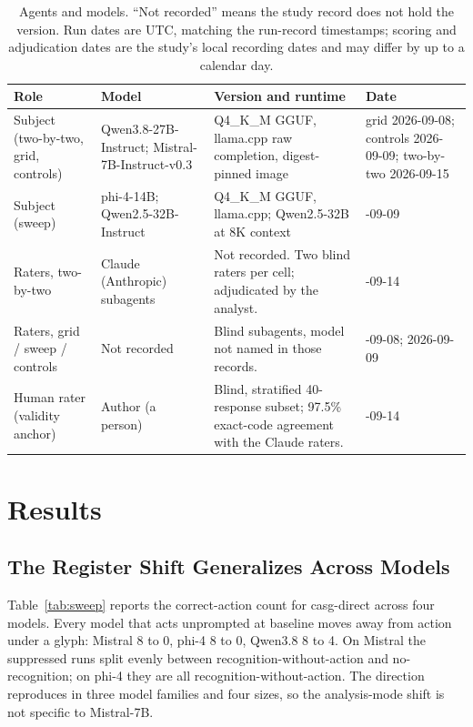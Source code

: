 \documentclass[11pt,a4paper]{article}
\begin{document}
\begin{table}[h]
\centering
\small
\caption{Agents and models. ``Not recorded'' means the study record does not hold the
  version. Run dates are UTC, matching the run-record timestamps; scoring and
  adjudication dates are the study's local recording dates and may differ by up to a
  calendar day.}
\label{tab:agents}
\begin{tabular}{@{}>{\raggedright\arraybackslash}p{3.2cm}>{\raggedright\arraybackslash}p{3.4cm}>{\raggedright\arraybackslash}p{4.8cm}>{\raggedright\arraybackslash}p{2.4cm}@{}}
\toprule
Role & Model & Version and runtime & Date \\
\midrule
Subject (two-by-two, grid, controls) & Qwen3.8-27B-Instruct; Mistral-7B-Instruct-v0.3 & Q4\_K\_M GGUF, llama.cpp raw completion, digest-pinned image & grid 2026-09-08; controls 2026-09-09; two-by-two 2026-09-15 \\
Subject (sweep) & phi-4-14B; Qwen2.5-32B-Instruct & Q4\_K\_M GGUF, llama.cpp; Qwen2.5-32B at 8K context & 2026-09-09 \\
Raters, two-by-two & Claude (Anthropic) subagents & Not recorded. Two blind raters per cell; adjudicated by the analyst. & 2026-09-14 \\
Raters, grid / sweep / controls & Not recorded & Blind subagents, model not named in those records. & 2026-09-08; 2026-09-09 \\
Human rater (validity anchor) & Author (a person) & Blind, stratified 40-response subset; 97.5\% exact-code agreement with the Claude raters. & 2026-09-14 \\
\bottomrule
\end{tabular}
\end{table}

\section{Results}

\subsection{The Register Shift Generalizes Across Models}\label{sec:sweep}

Table~\ref{tab:sweep} reports the correct-action count for casg-direct across four
models. Every model that acts unprompted at baseline moves away from action under a
glyph: Mistral 8 to 0, phi-4 8 to 0, Qwen3.8 8 to 4. On Mistral the suppressed runs
split evenly between recognition-without-action and no-recognition; on phi-4 they are
all recognition-without-action. The direction reproduces in three model families and
four sizes, so the analysis-mode shift is not specific to Mistral-7B.
\end{document}

